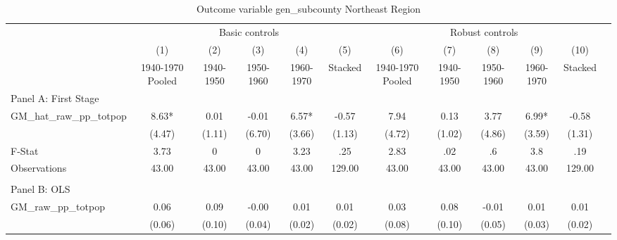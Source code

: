  \begin{table}[htbp]\centering {} \begin{threeparttable} \caption{Outcome variable gen\_subcounty Northeast Region} \begin{tabular}{l*{11}{c}} \toprule
          &\multicolumn{5}{c}{Basic controls}                                   &\multicolumn{5}{c}{Robust controls}                                  \\\cmidrule(lr){2-6}\cmidrule(lr){7-11}
          &\multicolumn{1}{c}{(1)}&\multicolumn{1}{c}{(2)}&\multicolumn{1}{c}{(3)}&\multicolumn{1}{c}{(4)}&\multicolumn{1}{c}{(5)}&\multicolumn{1}{c}{(6)}&\multicolumn{1}{c}{(7)}&\multicolumn{1}{c}{(8)}&\multicolumn{1}{c}{(9)}&\multicolumn{1}{c}{(10)}\\
          &\multicolumn{1}{c}{1940-1970 Pooled}&\multicolumn{1}{c}{1940-1950}&\multicolumn{1}{c}{1950-1960}&\multicolumn{1}{c}{1960-1970}&\multicolumn{1}{c}{Stacked}&\multicolumn{1}{c}{1940-1970 Pooled}&\multicolumn{1}{c}{1940-1950}&\multicolumn{1}{c}{1950-1960}&\multicolumn{1}{c}{1960-1970}&\multicolumn{1}{c}{Stacked}\\
\cmidrule(lr){1-11}
\multicolumn{10}{l}{Panel A: First Stage}\\
\cmidrule(lr){1-11}
GM\_hat\_raw\_pp\_totpop&      8.63*  &      0.01   &     -0.01   &      6.57*  &     -0.57   &      7.94   &      0.13   &      3.77   &      6.99*  &     -0.58   \\
          &    (4.47)   &    (1.11)   &    (6.70)   &    (3.66)   &    (1.13)   &    (4.72)   &    (1.02)   &    (4.86)   &    (3.59)   &    (1.31)   \\
\midrule
F-Stat    &      3.73   &         0   &         0   &      3.23   &       .25   &      2.83   &       .02   &        .6   &       3.8   &       .19   \\
Observations&     43.00   &     43.00   &     43.00   &     43.00   &    129.00   &     43.00   &     43.00   &     43.00   &     43.00   &    129.00   \\
\cmidrule[\heavyrulewidth](lr){1-11} \\ \cmidrule[\heavyrulewidth](lr){1-11}
\multicolumn{10}{l}{Panel B: OLS}\\
\cmidrule(lr){1-11}
GM\_raw\_pp\_totpop&      0.06   &      0.09   &     -0.00   &      0.01   &      0.01   &      0.03   &      0.08   &     -0.01   &      0.01   &      0.01   \\
          &    (0.06)   &    (0.10)   &    (0.04)   &    (0.02)   &    (0.02)   &    (0.08)   &    (0.10)   &    (0.05)   &    (0.03)   &    (0.02)   \\

\end{tabular}
\end{threeparttable}
\end{table}
